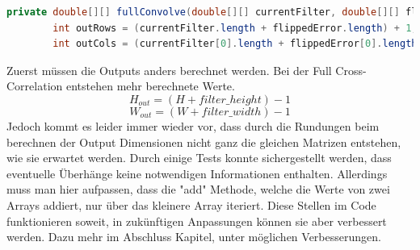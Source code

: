\documentclass[12pt]{article}
\begin{document}
\begin{lstlisting}[language=Java]
private double[][] fullConvolve(double[][] currentFilter, double[][] flippedError) {
        int outRows = (currentFilter.length + flippedError.length) + 1;
        int outCols = (currentFilter[0].length + flippedError[0].length) + 1;
\end{lstlisting}
Zuerst müssen die Outputs anders berechnet werden. Bei der Full Cross-Correlation entstehen mehr berechnete Werte. 
$$H_{out} = (H + filter\_height)-1$$
$$W_{out} = (W + filter\_ width)-1$$
Jedoch kommt es leider immer wieder vor, dass durch die Rundungen beim berechnen der Output Dimensionen nicht ganz die gleichen Matrizen entstehen, wie sie erwartet werden. Durch einige Tests konnte sichergestellt werden, dass eventuelle Überhänge keine notwendigen Informationen enthalten. Allerdings muss man hier aufpassen, dass die "add" Methode, welche die Werte von zwei Arrays addiert, nur über das kleinere Array iteriert. Diese Stellen im Code funktionieren soweit, in zukünftigen Anpassungen können sie aber verbessert werden. Dazu mehr im Abschluss Kapitel, unter möglichen Verbesserungen.
\end{document}
